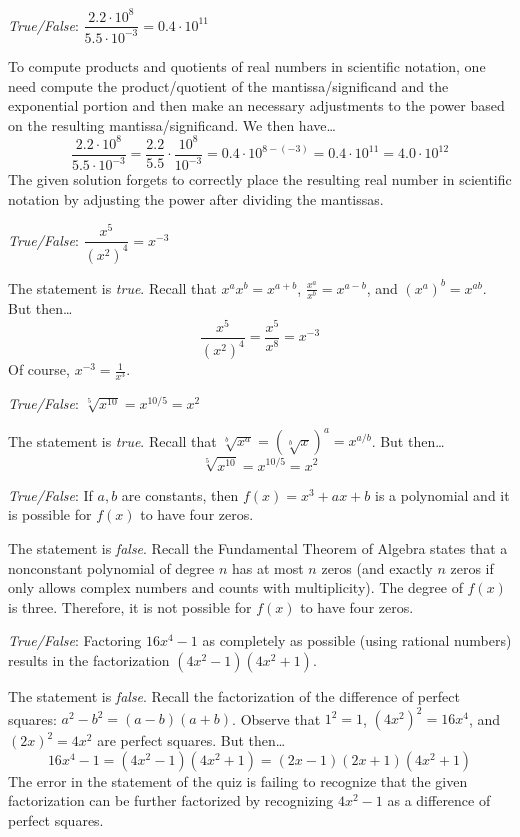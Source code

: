 \documentclass[11pt,letterpaper]{article}
\begin{document}
\quizsol \textit{True/False}: $\dfrac{2.2 \cdot 10^8}{5.5 \cdot 10^{-3}}= 0.4 \cdot 10^{11}$ \pspace

\sol To compute products and quotients of real numbers in scientific notation, one need compute the product/quotient of the mantissa/significand and the exponential portion and then make an necessary adjustments to the power based on the resulting mantissa/significand. We then have\dots
	\[
	\dfrac{2.2 \cdot 10^8}{5.5 \cdot 10^{-3}}= \dfrac{2.2}{5.5} \cdot \dfrac{10^8}{10^{-3}}= 0.4 \cdot 10^{8 - (-3)}= 0.4 \cdot 10^{11}= 4.0 \cdot 10^{12}
	\] 
The given solution forgets to correctly place the resulting real number in scientific notation by adjusting the power after dividing the mantissas. \pvspace{1.3cm}



\quizsol \textit{True/False}: $\dfrac{x^5}{(x^2)^4}= x^{-3}$ \pspace

\sol The statement is \textit{true}. Recall that $x^a x^b= x^{a+b}$, $\frac{x^a}{x^b}= x^{a-b}$, and $(x^a)^b= x^{ab}$. But then\dots
	\[
	\dfrac{x^5}{(x^2)^4}= \dfrac{x^5}{x^8}= x^{-3}
	\]
Of course, $x^{-3}= \frac{1}{x^3}$. \pvspace{1.3cm}



\quizsol \textit{True/False}: $\sqrt[5]{x^{10}}= x^{10/5}= x^2$ \pspace

\sol The statement is \textit{true}. Recall that $\sqrt[b]{x^a}= \left( \sqrt[b]{x} \right)^a= x^{a/b}$. But then\dots
	\[
	\sqrt[5]{x^{10}}= x^{10/5}= x^2
	\] \pvspace{1.3cm}



\quizsol \textit{True/False}: If $a, b$ are constants, then $f(x)= x^3 + ax + b$ is a polynomial and it is possible for $f(x)$ to have four zeros. \pspace

\sol The statement is \textit{false}. Recall the Fundamental Theorem of Algebra states that a nonconstant polynomial of degree $n$ has at most $n$ zeros (and exactly $n$ zeros if only allows complex numbers and counts with multiplicity). The degree of $f(x)$ is three. Therefore, it is not possible for $f(x)$ to have four zeros. \pvspace{1.3cm}



\quizsol \textit{True/False}: Factoring $16x^4 - 1$ as completely as possible (using rational numbers) results in the factorization $(4x^2 - 1)(4x^2 + 1)$. \pspace

\sol The statement is \textit{false}. Recall the factorization of the difference of perfect squares: $a^2 - b^2= (a - b)(a + b)$. Observe that $1^2= 1$, $(4x^2)^2= 16x^4$, and $(2x)^2= 4x^2$ are perfect squares. But then\dots
	\[
	16x^4 - 1= (4x^2 - 1)(4x^2 + 1)= (2x - 1)(2x + 1)(4x^2 + 1)
	\]
The error in the statement of the quiz is failing to recognize that the given factorization can be further factorized by recognizing $4x^2 - 1$ as a difference of perfect squares. \pvspace{1.1cm}
\end{document}
